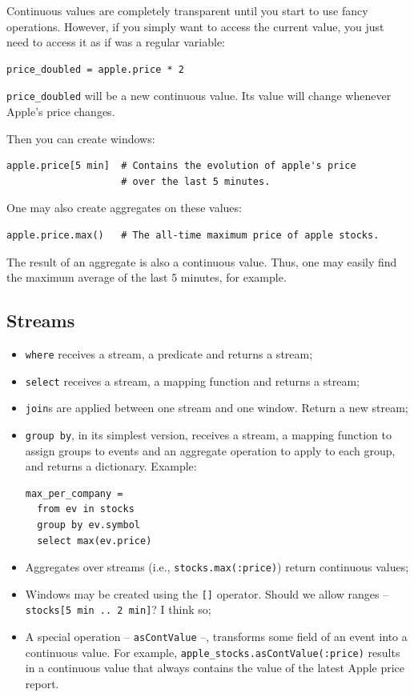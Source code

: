 \documentclass{report}
\begin{document}
Continuous values are completely transparent until you start to use
fancy operations. However, if you simply want to access the current
value, you just need to access it as if was a regular variable:

\begin{verbatim}
price_doubled = apple.price * 2
\end{verbatim}

\verb=price_doubled= will be a new continuous value. Its value will
change whenever Apple's price changes.

Then you can create windows:

\begin{verbatim}
apple.price[5 min]  # Contains the evolution of apple's price
                    # over the last 5 minutes.
\end{verbatim}

One may also create aggregates on these values:

\begin{verbatim}
apple.price.max()   # The all-time maximum price of apple stocks.
\end{verbatim}

The result of an aggregate is also a continuous value. Thus, one may
easily find the maximum average of the last 5 minutes, for example.

\subsection{Streams}

\begin{itemize}
\item \verb=where= receives a stream, a predicate and returns a stream;
\item \verb=select= receives a stream, a mapping function and returns
  a stream;
\item \verb=join=s are applied between one stream and one
  window. Return a new stream;
\item \verb=group by=, in its simplest version, receives a stream, a
  mapping function to assign groups to events and an aggregate
  operation to apply to each group, and returns a dictionary. Example:

\begin{verbatim}
max_per_company =
  from ev in stocks
  group by ev.symbol
  select max(ev.price)
\end{verbatim}

\item Aggregates over streams (i.e., \verb=stocks.max(:price)=) return
  continuous values;
\item Windows may be created using the \verb=[]= operator. Should we
  allow ranges -- \verb=stocks[5 min .. 2 min]=? I think so;
\item A special operation -- \verb=asContValue= --, transforms some
  field of an event into a continuous value. For example,
  \verb=apple_stocks.asContValue(:price)= results in a continuous
  value that always contains the value of the latest Apple price
  report.
\end{itemize}
\end{document}
